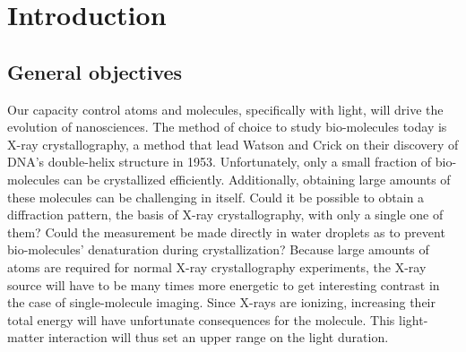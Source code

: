 \section{Introduction}


\subsection{General objectives}


Our capacity control atoms and molecules, specifically with light,
will drive the evolution of nanosciences. The method of choice to study 
bio-molecules today is X-ray crystallography, a method that lead Watson and 
Crick on their discovery of DNA's double-helix structure in 1953. 
Unfortunately, only a small fraction of bio-molecules can be crystallized 
efficiently. Additionally, obtaining large amounts of these molecules can be 
challenging in itself. Could it be possible to obtain a diffraction pattern, 
the basis of X-ray crystallography, with only a single one of them? Could the 
measurement be made directly in water droplets as to prevent bio-molecules' 
denaturation during crystallization? Because large amounts of atoms are 
required for normal X-ray crystallography experiments, the X-ray source will 
have to be many times more energetic to get interesting contrast in the 
case of single-molecule imaging. Since X-rays are ionizing, increasing their 
total energy will have unfortunate consequences for the molecule. This 
light-matter interaction will thus set an upper range on the light duration.

